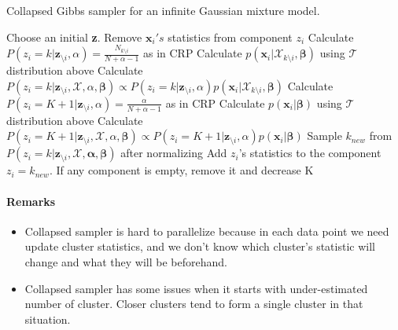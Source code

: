 \documentclass[a4paper]{article}
\begin{document}
\begin{algorithm}
  \caption{Collapsed Gibbs sampler for an infinite Gaussian mixture model.}\label{collapsedgibbs}
  \begin{algorithmic}[1]
    
  \State Choose an initial \textbf{z}.
   
        \State Remove $\mathbf{x}_i's$ statistics from component $z_i$ 
         
            \State Calculate $P(z_i = k | \mathbf{z}_{\setminus i},\alpha) = \frac{N_{k\setminus i}}{N+\alpha-1}$ as in CRP
            \State Calculate $p(\mathbf{x}_i|\mathcal{X}_{k\setminus i},\mathbf{\beta})$ using $\mathcal{T}$ distribution above
            \State Calculate $P(z_i = k | \mathbf{z}_{\setminus i},\mathcal{X},\alpha,\mathbf{\beta}) \propto P(z_i = k | \mathbf{z}_{\setminus i},\alpha) p(\mathbf{x}_i|\mathcal{X}_{k\setminus i}, \mathbf{\beta})$
        \EndFor
        \State Calculate $P(z_i = K+1 | \mathbf{z}_{\setminus i},\alpha) = \frac{\alpha}{N+\alpha-1}$ as in CRP 
        \State Calculate $p(\mathbf{x}_i|\mathbf{\beta})$ using $\mathcal{T}$ distribution above
        \State Calculate $P(z_i = K+1 | \mathbf{z}_{\setminus i},\mathcal{X},\alpha, \mathbf{\beta}) \propto P(z_i = K+1 | \mathbf{z}_{\setminus i},\alpha)p(\mathbf{x}_i|\mathbf{\beta})$
        \State Sample $k_{new}$ from $P(z_i = k | \mathbf{z}_{\setminus i},\mathcal{X},\mathbf{\alpha},\mathbf{\beta})$ after normalizing
        \State Add $z_i$'s statistics to the component $z_i = k_{new}$.
        \State If any component is empty, remove it and decrease K
    \EndFor
  \EndFor
  \end{algorithmic}
\end{algorithm}


\paragraph{Remarks}

\begin{itemize}
\item
  Collapsed sampler is hard to parallelize because in each data point we
  need update cluster statistics, and we don't know which cluster's
  statistic will change and what they will be beforehand.
\item
  Collapsed sampler has some issues when it starts with under-estimated
  number of cluster. Closer clusters tend to form a single cluster in
  that situation.
\end{itemize}
\end{document}
